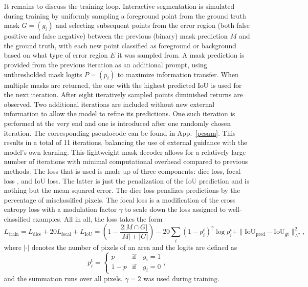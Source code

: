 It remains to discuss the training loop. Interactive segmentation is simulated during training by uniformly sampling a foreground point from the ground truth mask $G = (g_{i})$ and selecting subsequent points from the error region (both false positive and false negative) between the previous (binary) mask prediction $M$ and the ground truth, with each new point classified as foreground or background based on what type of error region $E$ it was sampled from. A mask prediction is provided from the previous iteration as an additional prompt, using unthresholded mask logits $P = (p_{i})$ to maximize information transfer. When multiple masks are returned, the one with the highest predicted IoU is used for the next iteration. After eight iteratively sampled points diminished returns are observed. Two additional iterations are included without new external information to allow the model to refine its predictions. One such iteration is performed at the very end and one is introduced after one randomly chosen iteration. The corresponding pseudocode can be found in App.~\ref{pcsam}. This results in a total of 11 iterations, balancing the use of external guidance with the model's own learning. This lightweight mask decoder allows for a relatively large number of iterations with minimal computational overhead compared to previous methods. The loss that is used is made up of three components: dice loss, focal loss \cite{liu2009otsu}, and IoU loss. The latter is just the penalization of the IoU prediction and is nothing but the mean squared error. The dice loss penalizes predictions by the percentage of misclassified pixels. The focal loss is a modification of the cross entropy loss with a modulation factor $\gamma$ to scale down the loss assigned to well-classified examples. All in all, the loss takes the form
\begin{equation}\label{samloss}
	L_{\text{train}} = L_{\text{dice}} + 20L_{\text{focal}}+ L_{\text{IoU}} = \left(1 - \dfrac{2|M \cap G|}{|M| + |G|}\right) - 20\sum_{i}(1-p^t_i)^{\gamma}\log p^t_i + \|\text{IoU}_{\text{pred}} - \text{IoU}_{\text{gt}}\|_{L^2}^{2},
\end{equation}
where $|\cdot|$ denotes the number of pixels of an area and the logits are defined as
\begin{equation*}
	p_i^\text{t}=\begin{cases}p&\text{if}\quad g_i=1\\1-p&\text{if}\quad g_{i}=0\end{cases},
\end{equation*}
and the summation runs over all pixels. $\gamma = 2$ was used during training.

